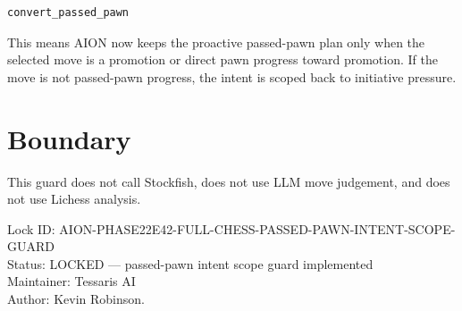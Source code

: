 \documentclass[11pt,a4paper]{article}
\begin{document}
\begin{verbatim}
convert_passed_pawn
\end{verbatim}

This means AION now keeps the proactive passed-pawn plan only when the selected move is a promotion or direct pawn progress toward promotion. If the move is not passed-pawn progress, the intent is scoped back to initiative pressure.

\section{Boundary}

This guard does not call Stockfish, does not use LLM move judgement, and does not use Lichess analysis.

\bigskip

\noindent
Lock ID: AION-PHASE22E42-FULL-CHESS-PASSED-PAWN-INTENT-SCOPE-GUARD\\
Status: LOCKED --- passed-pawn intent scope guard implemented\\
Maintainer: Tessaris AI\\
Author: Kevin Robinson.
\end{document}
